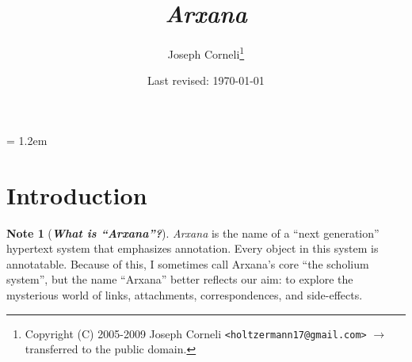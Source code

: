 \theoremstyle{definition}
\newtheorem{nota}{Note}[section]

\parindent = 1.2em

\newenvironment{notate}[1]
  {\begin{nota}[{\bf {\em #1}}]}%
  {\end{nota}}

\makeatletter
\newenvironment{elisp}
  {\let\ORGverbatim@font\verbatim@font
   \def\verbatim@font{\ttfamily\scshape}%
   \verbatim}
  {\endverbatim
  \let\verbatim@font\ORGverbatim@font}
\makeatother

\makeatletter
\newenvironment{common}[1]
  {\let\ORGverbatim@font\verbatim@font
   \def\verbatim@font{\ttfamily\scshape}%
   \verbatim}
  {\endverbatim
  \let\verbatim@font\ORGverbatim@font}
\makeatother

\makeatletter
\newenvironment{idea}
  {\let\ORGverbatim@font\verbatim@font
   \def\verbatim@font{\ttfamily\slshape}%
   \verbatim}
  {\endverbatim
  \let\verbatim@font\ORGverbatim@font}
\makeatother



\title{\emph{Arxana}}

\author{Joseph Corneli\thanks{Copyright (C) 2005-2009
    Joseph Corneli {\tt <holtzermann17@gmail.com>}\newline
    $\longrightarrow$ transferred to the public domain.}}
\date{Last revised: \today}

\maketitle


\tableofcontents

\section{Introduction}

\begin{notate}{What is ``Arxana''?} \label{arxana}
\emph{Arxana} is the name of a ``next generation''
hypertext system that emphasizes annotation.  Every object
in this system is annotatable.  Because of this, I
sometimes call Arxana's core ``the scholium system'', but
the name ``Arxana'' better reflects our aim: to explore
the mysterious world of links, attachments,
correspondences, and side-effects.
\end{notate}

